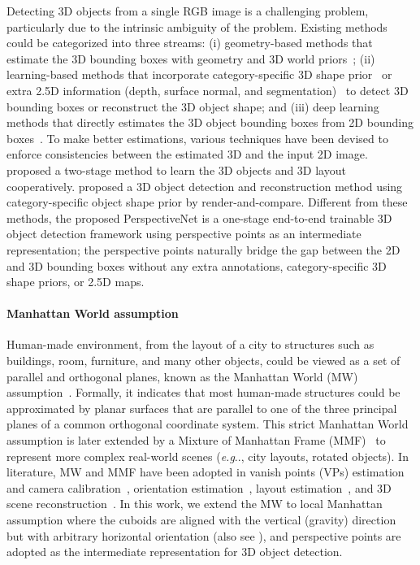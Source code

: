\documentclass{article}
\makeatletter
\DeclareRobustCommand\onedot{\futurelet\@let@token\@onedot}
\def\@onedot{\ifx\@let@token.\else.\null\fi\xspace}
\def\eg{\emph{e.g}\onedot} \def\Eg{\emph{E.g}\onedot}
\makeatother
\begin{document}
Detecting 3D objects from a single RGB image is a challenging problem, particularly due to the intrinsic ambiguity of the problem. Existing methods could be categorized into three streams: (i) geometry-based methods that estimate the 3D bounding boxes with geometry and 3D world priors~\cite{zhao2011image,zhao2013scene,choi2013understanding,lin2013holistic,zhang2014panocontext}; (ii) learning-based methods that incorporate category-specific 3D shape prior~\cite{izadinia2016im2cad,huang2018holistic,he2019mono3d++} or extra 2.5D information (depth, surface normal, and segmentation)~\cite{kundu20183d,yao20183d,xu2018multi} to detect 3D bounding boxes or reconstruct the 3D object shape; and (iii) deep learning methods that directly estimates the 3D object bounding boxes from 2D bounding boxes~\cite{chen20153d,chen2016monocular,mousavian20173d,huang2018cooperative}. To make better estimations, various techniques have been devised to enforce consistencies between the estimated 3D and the input 2D image. \citet{huang2018cooperative} proposed a two-stage method to learn the 3D objects and 3D layout cooperatively. \citet{kundu20183d} proposed a 3D object detection and reconstruction method using category-specific object shape prior by render-and-compare. Different from these methods, the proposed PerspectiveNet is a one-stage end-to-end trainable 3D object detection framework using perspective points as an intermediate representation; the perspective points naturally bridge the gap between the 2D and 3D bounding boxes without any extra annotations, category-specific 3D shape priors, or 2.5D maps.

\paragraph{Manhattan World assumption}

Human-made environment, from the layout of a city to structures such as buildings, room, furniture, and many other objects, could be viewed as a set of parallel and orthogonal planes, known as the Manhattan World (MW) assumption~\cite{coughlan1999manhattan}. Formally, it indicates that most human-made structures could be approximated by planar surfaces that are parallel to one of the three principal planes of a common orthogonal coordinate system. This strict Manhattan World assumption is later extended by a Mixture of Manhattan Frame (MMF)~\cite{straub2014mixture} to represent more complex real-world scenes (\eg, city layouts, rotated objects). In literature, MW and MMF have been adopted in vanish points (VPs) estimation and camera calibration~\cite{schindler2004atlanta,kroeger2015joint}, orientation estimation~\cite{bosse2003vanishing,straub2015real,ghanem2015robust}, layout estimation~\cite{hedau2009recovering,lee2009geometric,hedau2010thinking,schwing2012efficient,zou2018layoutnet}, and 3D scene reconstruction~\cite{delage2007automatic,furukawa2009manhattan,xiao2013basic,xiao2014reconstructing,ren2016three,liu2017single}. In this work, we extend the MW to local Manhattan assumption where the cuboids are aligned with the vertical (gravity) direction but with arbitrary horizontal orientation (also see \citet{xiao2014reconstructing}), and perspective points are adopted as the intermediate representation for 3D object detection.
\end{document}
